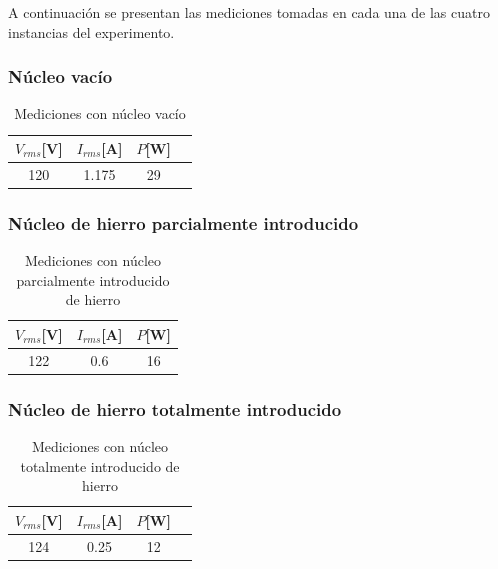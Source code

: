 \documentclass{article}
\begin{document}
            A continuación se presentan las mediciones tomadas en cada una de las cuatro instancias del experimento.

            \subsubsection{Núcleo vacío}

            \begin{table}[H]
                \centering
                \begin{tabular}{|c|c|c|c|}
                    \hline
                    $V_{rms} $[V] & $I_{rms} $[A] & $P $[W]  \\ \hline
                    120           & 1.175         & 29     \\ \hline
                \end{tabular}
                \caption{Mediciones con núcleo vacío}
                \label{tab:mediciones-nucleo-vacio}
            \end{table}

            \subsubsection{Núcleo de hierro parcialmente introducido}

            \begin{table}[H]
                \centering
                \begin{tabular}{|c|c|c|}
                    \hline
                    $V_{rms} $[V] & $I_{rms} $[A] & $P $[W] \\ \hline
                    122           & 0.6         & 16    \\ \hline
                \end{tabular}
                \caption{Mediciones con núcleo parcialmente introducido de hierro}
                \label{tab:mediciones-nucleo-parcialmente-introducido-hierro}
            \end{table}

            \subsubsection{Núcleo de hierro totalmente introducido}

            \begin{table}[H]
                \centering
                \begin{tabular}{|c|c|c|c|}
                    \hline
                    $V_{rms} $[V] & $I_{rms} $[A] & $P $[W] \\ \hline
                    124           & 0.25         & 12    \\ \hline
                \end{tabular}
                \caption{Mediciones con núcleo totalmente introducido de hierro}
                \label{tab:mediciones-nucleo-totalmente-introducido-hierro}
            \end{table}
\end{document}
